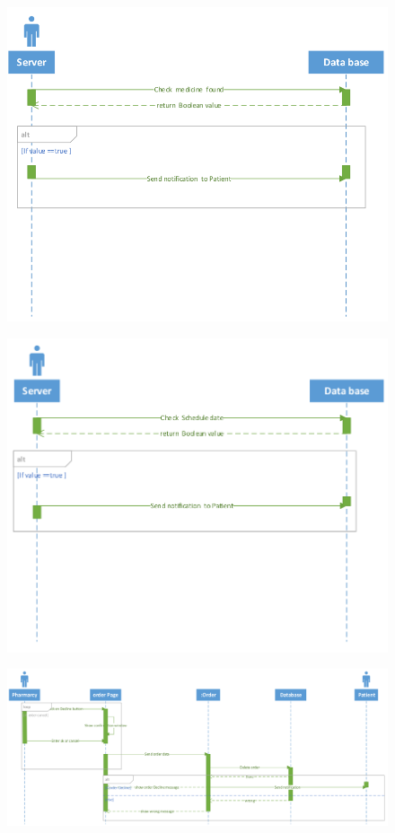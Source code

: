 \documentclass[]{article}
\begin{document}
\begin{figure}[H]
\centering
\includegraphics[scale=0.3]{./sequence/27}
\end{figure}
\begin{figure}[H]
\centering
\includegraphics[scale=0.3]{./sequence/28}
\end{figure}
\begin{figure}[H]
\centering
\includegraphics[scale=0.25]{./sequence/29}
\end{figure}
\end{document}

